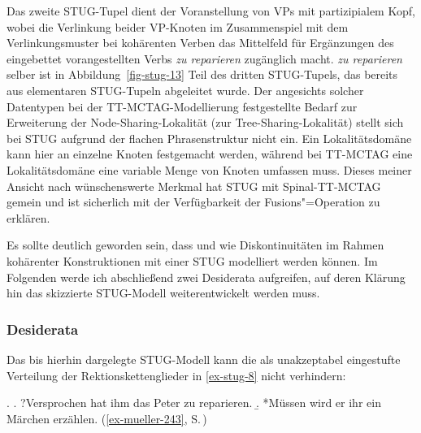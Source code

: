 Das zweite STUG-Tupel dient der Voranstellung von VPs mit partizipialem Kopf, wobei die Verlinkung beider VP-Knoten im Zusammenspiel mit dem Verlinkungsmuster bei kohärenten Verben das Mittelfeld für Ergänzungen des eingebettet vorangestellten Verbs {\it zu reparieren} zugänglich macht. {\it zu reparieren} selber ist in Abbildung~\ref{fig-stug-13} Teil des dritten STUG-Tupels, das bereits aus elementaren STUG-Tupeln abgeleitet wurde. Der angesichts solcher Datentypen bei der TT-MCTAG-Modellierung festgestellte Bedarf zur Erweiterung der Node-Sharing-Lokalität (zur Tree-Sharing-Lokalität) stellt sich bei STUG aufgrund der flachen Phrasenstruktur nicht ein. Ein Lokalitätsdomäne kann hier an einzelne Knoten festgemacht werden, während bei TT-MCTAG eine Lokalitätsdomäne eine variable Menge von Knoten umfassen muss. Dieses meiner Ansicht nach wünschenswerte Merkmal hat STUG mit Spinal-TT-MCTAG gemein und ist sicherlich mit der Verfügbarkeit der Fusions"=Operation zu erklären.%

Es sollte deutlich geworden sein, dass und wie Diskontinuitäten im Rahmen kohärenter Konstruktionen mit einer STUG modelliert werden können. Im Folgenden werde ich abschlie\ss end zwei Desiderata aufgreifen, auf deren Klärung hin das skizzierte STUG-Modell weiterentwickelt werden muss.

\subsubsection*{Desiderata}

Das bis hierhin dargelegte STUG-Modell kann die als unakzeptabel eingestufte Verteilung der Rektionskettenglieder in \ref{ex-stug-8} nicht verhindern:

\ex. \label{ex-stug-8}
\a. ?Versprochen hat ihm das Peter zu reparieren.\label{ex-stug-8-a}
\b. *Müssen wird er ihr ein Märchen erzählen. \hfill (\ref{ex-mueller-243}, S.\,\pageref{ex-mueller-243})\label{ex-stug-8-b}

